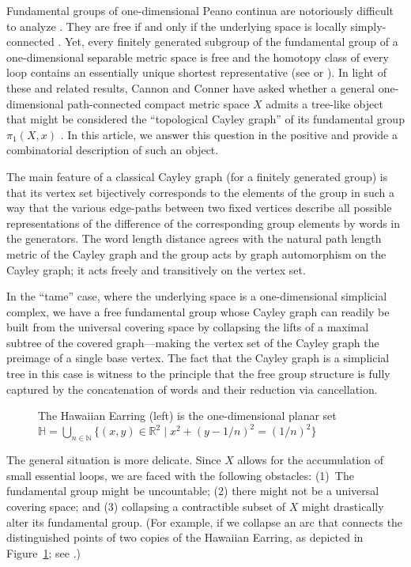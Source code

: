 \documentclass{amsart}
\theoremstyle{definition}
\theoremstyle{remark}
\numberwithin{equation}{section}
\begin{document}
\noindent Fundamental groups of one-dimensional Peano continua are notoriously difficult to analyze \cite{E1, E2, E3, ADTW}.
 They are free if and only if the underlying space is locally simply-connected \cite[Theorem~2.2]{CF2}. Yet, every finitely generated subgroup of the fundamental group of a one-dimensional separable metric space is free \cite[Section~5]{CF1} and the homotopy class of every loop contains an essentially unique shortest representative (see \cite[Lemma 3.1 and Theorem 3.1]{CF2} or \cite[Theorem~3.9]{CC3}).
In light of these and related results, Cannon and
Conner have asked whether a general one-dimensional path-connected compact metric
space $X$ admits a tree-like object that might be
considered the ``topological Cayley graph'' of its fundamental
group $\pi_1(X,x)$ \cite[Question~3.9.1]{CC3}. In this article, we answer this question in the positive and provide a  combinatorial description of
such an object.

The main feature of a classical Cayley graph (for a finitely generated group) is that its vertex set bijectively corresponds to the elements of the group in such a way that the various edge-paths between two fixed vertices describe all possible representations of the difference of the corresponding group elements by words in the generators. The word length distance agrees with the natural path length metric of the Cayley graph and  the group acts by graph automorphism on the Cayley graph; it acts freely and transitively on the vertex set.

In the ``tame'' case, where the underlying space is a  one-dimensional simplicial complex, we have a free fundamental group whose Cayley graph can readily be built from the universal covering space by collapsing the lifts of a maximal subtree of the covered graph---making the vertex set of the Cayley graph the preimage of a single base vertex. The fact that the Cayley graph is a simplicial tree in this case is witness to the principle that the free group structure is fully captured by the concatenation of words and their reduction via cancellation.

\pagebreak
\begin{figure}[h!] \caption{\label{HH} The Hawaiian Earring (left) is the one-dimensional planar set  $\mathbb{H}=\bigcup_{n\in \mathbb{N}}\{(x,y)\in \mathbb{R}^2\mid x^2+(y-1/n)^2=(1/n)^2\}$}  \end{figure}
The general situation is  more delicate.  Since  $X$ allows for the accumulation of small essential loops, we are faced with the following obstacles: (1)~The fundamental group might be uncountable; (2) there might not be a universal covering space; and (3)
collapsing a contractible subset of $X$ might drastically alter its fundamental group.
   (For example, if we collapse an arc that connects the distinguished points of two copies of the Hawaiian Earring, as depicted in Figure~\ref{HH}; see \cite[Theorem~1.2]{E2}.)
\end{document}
